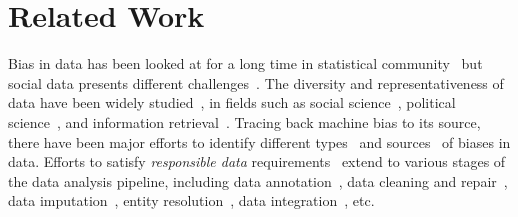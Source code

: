 \documentclass[11pt]{article}
\begin{document}
\section{Related Work}\label{related} 

Bias in data has been looked at for a long time in statistical community~\cite{neyman1936contributions} but social data presents different challenges~\cite{olteanu2019social,fairmlbook,barocas2016big,jk2019bias,drosou2017diversity}.
The diversity and representativeness of data have been widely studied~\cite{drosou2017diversity}, in fields such as social science~\cite{berrey2015enigma, dobbin2016diversity,simpson1949measurement}, political science~\cite{surowiecki2005wisdom}, and information retrieval~\cite{agrawal2009diversifying}. 
Tracing back machine bias to its source, there have been major efforts to identify different types~\cite{mehrabi2021survey, olteanu2019social,friedman1996bias} and sources~\cite{torralba2011unbiased,crawford2013hidden,diakopoulos2015algorithmic} of biases in data. Efforts to satisfy {\it responsible data} requirements~\cite{nargesian2022responsible} extend to various stages of the data analysis pipeline, including data annotation~\cite{li2020towards,lazier2023fairness}, data cleaning and repair~\cite{SalimiRHS19,tae2019data,salimi2020database}, data imputation~\cite{martinez2019fairness}, entity resolution~\cite{shahbazi2023through,fanourakis2023fairer}, data integration~\cite{nargesian2022responsible,nargesian2021tailoring}, etc. 
\end{document}
